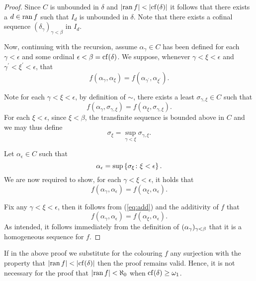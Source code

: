 \begin{proof}
	Since $C$ is unbounded in $\delta$ and $\left\lvert\operatorname{ran} f\right\rvert<\left\lvert\operatorname{cf}(\delta)\right\rvert$
	it follows that there exists a $d\in\operatorname{ran} f$ such that $I_d$ is unbounded
	in $\delta$.  Note that there exists a cofinal sequence
	$(\delta_\gamma)_{\gamma<\beta}$ in $I_d$.

	Now, continuing with the recursion, assume $\alpha_\gamma\in C$ has been
	defined for each $\gamma<\epsilon$ and some ordinal
	$\epsilon<\beta=\operatorname{cf}(\delta)$.  We suppose, whenever $\gamma<\xi<\epsilon$
	and $\gamma^\prime<\xi^\prime<\epsilon$, that
	\begin{equation}
		f(\alpha_\gamma,\alpha_\xi)=f(\alpha_{\gamma^\prime},\alpha_{\xi^\prime}).
	\end{equation}

	Note for each $\gamma<\xi<\epsilon$, by definition of $\sim$, there exists a
	least $\sigma_{\gamma,\xi}\in C$ such that
	\begin{equation}
		f(\alpha_\gamma,\sigma_{\gamma,\xi})=f(\alpha_\xi,\sigma_{\gamma,\xi}).\label{eq:add}
	\end{equation}
	For each $\xi<\epsilon$, since $\xi<\beta$, the transfinite sequence is
	bounded above in $C$ and we may thus define
	\begin{equation}
			\sigma_\xi=\sup_{\gamma<\xi}\sigma_{\gamma,\xi}.
	\end{equation}

	Let $\alpha_\epsilon\in C$ such that
	\begin{equation}
		\alpha_\epsilon=\sup\left\lbrace \sigma_{\xi}\colon \xi<\epsilon \right\rbrace.
	\end{equation}
	We are now required to show, for each $\gamma<\xi<\epsilon$, it holds
	that
	\begin{equation}
		f(\alpha_\gamma,\alpha_\epsilon)=f(\alpha_\xi,\alpha_\epsilon).
	\end{equation}

	Fix any $\gamma<\xi<\epsilon$, then it follows from (\ref{eq:add}) and the
	additivity of $f$ that
	\begin{equation}
		f(\alpha_\gamma,\alpha_\epsilon)=f(\alpha_\xi,\alpha_\epsilon).
	\end{equation}
	As intended, it follows immediately from the definition of
	$(\alpha_\gamma)_{\gamma<\beta}$ that it is a homogeneous sequence for
	$f$.
\end{proof}

\begin{rem}
	If in the above proof we substitute for the colouring $f$ any surjection
	with the property that $\left\lvert\operatorname{ran} f\right\rvert<\left\lvert\operatorname{cf}(\delta)\right\rvert$ then the proof
	remains valid.  Hence, it is not necessary for the proof that $\left\lvert\operatorname{ran}
	f\right\rvert<\aleph_0$ when $\operatorname{cf}(\delta)\geq\omega_1$.
\end{rem}


